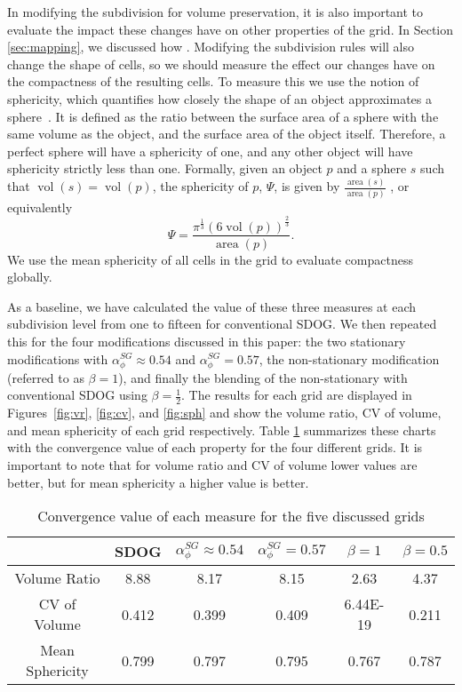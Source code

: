In modifying the subdivision for volume preservation, it is also important to evaluate the impact these changes have on other properties of the grid. In Section \ref{sec:mapping}, we discussed how . Modifying the subdivision rules will also change the shape of cells, so we should measure the effect our changes have on the compactness of the resulting cells. To measure this we use the notion of sphericity, which quantifies how closely the shape of an object approximates a sphere~\cite{wadell1935volume}. It is defined as the ratio between the surface area of a sphere with the same volume as the object, and the surface area of the object itself. Therefore, a perfect sphere will have a sphericity of one, and any other object will have sphericity strictly less than one. Formally, given an object $p$ and a sphere $s$ such that $\operatorname{vol}(s) = \operatorname{vol}(p)$, the sphericity of $p$, $\Psi$, is given by $\frac{\operatorname{area}(s)}{\operatorname{area}(p)}$ , or equivalently 
%
\begin{equation}
\Psi = \frac{\pi^{\frac{1}{3}}\left( 6\operatorname{vol}(p) \right)^{\frac{2}{3}}}{\operatorname{area}(p)}.
\label{eq:sphericity}
\end{equation}
%
We use the mean sphericity of all cells in the grid to evaluate compactness globally.



As a baseline, we have calculated the value of these three measures at each subdivision level from one to fifteen for conventional SDOG. We then repeated this for the four modifications discussed in this paper: the two stationary modifications with $\alpha_{\phi}^{SG} \approx 0.54$ and $\alpha_{\phi}^{SG} = 0.57$, the non-stationary modification (referred to as $\beta = 1$), and finally the blending of the non-stationary with conventional SDOG using $\beta = \frac{1}{2}$. The results for each grid are displayed in Figures~\ref{fig:vr}, \ref{fig:cv}, and \ref{fig:sph} and show the volume ratio, CV of volume, and mean sphericity of each grid respectively. Table \ref{tab:results} summarizes these charts with the convergence value of each property for the four different grids. It is important to note that for volume ratio and CV of volume lower values are better, but for mean sphericity a higher value is better.

\begin{table}[]
	\centering
	\caption{Convergence value of each measure for the five discussed grids}
	\begin{tabular}{|c|c|c|c|c|c|}
		\hline
		& SDOG & $\alpha_{\phi}^{SG} \approx 0.54$ & $\alpha_{\phi}^{SG} = 0.57$ & $\beta = 1$ & $\beta = 0.5$ \\ \hline
		Volume Ratio    & 8.88   & 8.17   & 8.15   & 2.63      & 4.37   \\ \hline
		CV of Volume    & 0.412  & 0.399  & 0.409  & 6.44E-19  & 0.211  \\ \hline
		Mean Sphericity & 0.799  & 0.797  & 0.795  & 0.767     & 0.787  \\ \hline
	\end{tabular}
	\label{tab:results}
\end{table}


